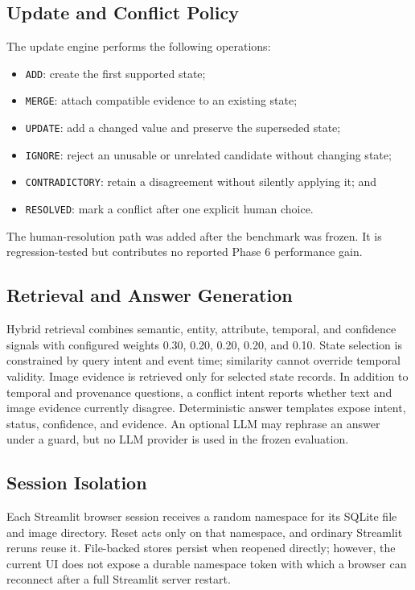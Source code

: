 \documentclass[conference]{IEEEtran}
\begin{document}
\subsection{Update and Conflict Policy}
The update engine performs the following operations:
\begin{itemize}
    \item \texttt{ADD}: create the first supported state;
    \item \texttt{MERGE}: attach compatible evidence to an existing state;
    \item \texttt{UPDATE}: add a changed value and preserve the superseded state;
    \item \texttt{IGNORE}: reject an unusable or unrelated candidate without changing state;
    \item \texttt{CONTRADICTORY}: retain a disagreement without silently applying it; and
    \item \texttt{RESOLVED}: mark a conflict after one explicit human choice.
\end{itemize}
The human-resolution path was added after the benchmark was frozen. It is regression-tested but contributes no reported Phase 6 performance gain.

\subsection{Retrieval and Answer Generation}
Hybrid retrieval combines semantic, entity, attribute, temporal, and confidence signals with configured weights 0.30, 0.20, 0.20, 0.20, and 0.10. State selection is constrained by query intent and event time; similarity cannot override temporal validity. Image evidence is retrieved only for selected state records. In addition to temporal and provenance questions, a conflict intent reports whether text and image evidence currently disagree. Deterministic answer templates expose intent, status, confidence, and evidence. An optional LLM may rephrase an answer under a guard, but no LLM provider is used in the frozen evaluation.

\subsection{Session Isolation}
Each Streamlit browser session receives a random namespace for its SQLite file and image directory. Reset acts only on that namespace, and ordinary Streamlit reruns reuse it. File-backed stores persist when reopened directly; however, the current UI does not expose a durable namespace token with which a browser can reconnect after a full Streamlit server restart.
\end{document}
